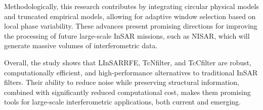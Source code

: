 \documentclass[remotesensing,article,submit,pdftex,moreauthors]{Definitions/mdpi}
\begin{document}
Methodologically, this research contributes by integrating circular physical models and truncated empirical models, allowing for adaptive window selection based on local phase variability. 
These advances present promising directions for improving the processing of future large-scale InSAR missions, such as NISAR, which will generate massive volumes of interferometric data.


%
%
%

Overall, the study shows that LInSARRFE, TcNfilter, and TcCfilter are robust, computationally efficient, and high-performance alternatives to traditional InSAR filters. 
Their ability to reduce noise while preserving structural information, combined with significantly reduced computational cost, makes them promising tools for large-scale interferometric applications, both current and emerging.

\vspace{6pt} 
\end{document}
